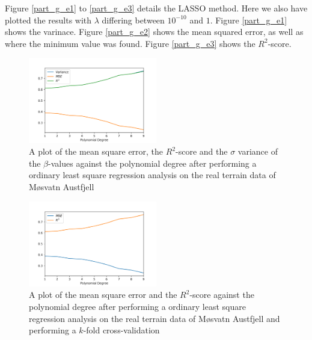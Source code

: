 \documentclass[a4paper,10pt,english]{article}
\begin{document}
Figure \ref{part_g_e1} to \ref{part_g_e3} details the LASSO method. Here we also have plotted the results with $\lambda$ differing between $10^{-10}$ and $1$.
Figure \ref{part_g_e1} shows the varinace.
Figure \ref{part_g_e2} shows the mean squared error, as well as where the minimum value was found.
Figure \ref{part_g_e3} shows the $R^2$-score.




\begin{figure}[H]
	\centering 
	\includegraphics[width = 0.5\textwidth, center]{../real_output/part_A.png}
	\caption{
		A plot of the mean square error, the $R^2$-score and the $\sigma$ variance of the $\beta$-values against the polynomial degree after performing a ordinary least square regression analysis on the real terrain data of Møsvatn Austfjell
	}
	\label{part_g_a}
\end{figure}


\begin{figure}[H]
	\centering 
	\includegraphics[width = 0.5\textwidth, center]{../real_output/part_B.png}
	\caption{
		A plot of the mean square error and the $R^2$-score against the polynomial degree after performing a ordinary least square regression analysis on the real terrain data of Møsvatn Austfjell and performing a $k$-fold cross-validation
	}
	\label{part_g_b}
\end{figure}
\end{document}
